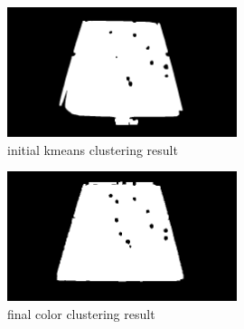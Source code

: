 \begin{figure}
    \centering
    \includegraphics[width=0.6\textwidth]{./imgs/kmeans_cluster.png}
    \caption{initial kmeans clustering result}
\end{figure}

\begin{figure}
    \centering
    \includegraphics[width=0.6\textwidth]{./imgs/color_cluster.png}
    \caption{final color clustering result}
\end{figure}
